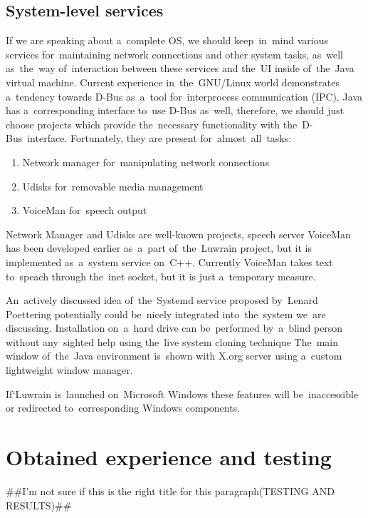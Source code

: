 \documentclass{acm_proc_article-sp}
\begin{document}
\subsection{System-level services}

If we are speaking about a~complete OS, 
we should keep~in~mind various services for~maintaining network connections and other system tasks, 
as~well as~the~way of~interaction between these services and the~UI inside of~the~Java virtual machine.
Current experience in~the~GNU/Linux world demonstrates a~tendency towards  
D-Bus \cite{dbus} as~a~tool for~interprocess communication (IPC).
Java has a~corresponding interface to~use D-Bus as~well,
therefore, we should just choose projects 
which provide the~necessary functionality with the~D-Bus~interface.
Fortunately, they are present for~almost~all~tasks:

\begin{enumerate} 

\item{
Network manager \cite{nm} for~manipulating network connections
}

\item {
Udisks \cite{udisks} for~removable media management
}

\item {
VoiceMan \cite{voiceman} for~speech output
}

\end{enumerate}

Network Manager and Udisks are well-known projects,
speech server VoiceMan has been developed earlier as~a~part of~the~Luwrain project, 
but it is implemented as~a~system service on~C++.
Currently VoiceMan takes text to~speach through the~inet socket,
but it is just a~temporary measure. 

An~actively discussed idea of~the~Systemd service \cite{systemd}
proposed by~Lenard Poettering 
potentially could be~nicely integrated into~the~system we~are discussing.
Installation on~a~hard drive can be~performed by~a~blind person without any~sighted help 
using the~live system cloning technique \cite{livecdclone}
The~main window of~the~Java environment is~shown with X.org server \cite{xorg}
using a~custom lightweight window manager.

If`Luwrain is~launched on~Microsoft Windows these features will be~inaccessible 
or redirected to~corresponding Windows components.

\section{Obtained experience and testing}##I’m not sure if this is the right title for this paragraph(TESTING AND RESULTS)## 
\end{document}
